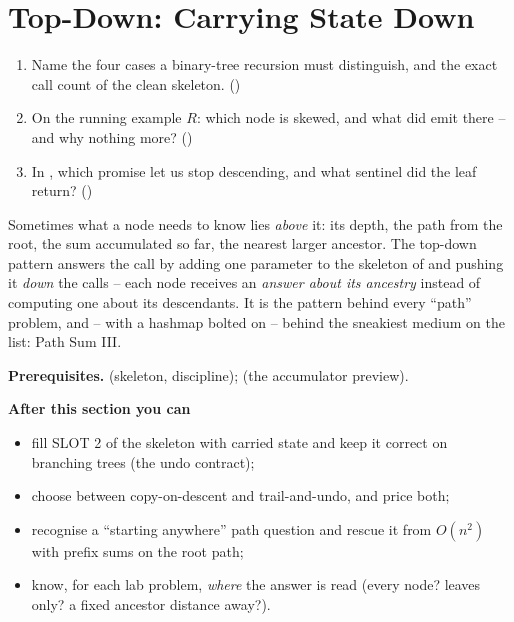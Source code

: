 \section{Top-Down: Carrying State Down}\label{sec:c02-topdown}

\begin{previouslybox}
\begin{enumerate}[nosep, leftmargin=1.6em]
  \item Name the four cases a binary-tree recursion must distinguish, and the
        exact call count of the clean skeleton. ()
  \item On the running example $R$: which node is skewed, and what did
         emit there -- and why nothing more?
        ()
  \item In , which promise let us stop descending, and
        what sentinel did the leaf return? ()
\end{enumerate}
\end{previouslybox}

\begin{topicintro}
Sometimes what a node needs to know lies \emph{above} it: its depth, the path
from the root, the sum accumulated so far, the nearest larger ancestor. The
top-down pattern answers the call by adding one parameter to the skeleton of
 and pushing it \emph{down} the calls -- each node receives an
\emph{answer about its ancestry} instead of computing one about its descendants.
It is the pattern behind every ``path'' problem, and -- with a hashmap bolted on
-- behind the sneakiest medium on the list: Path Sum III.

\textbf{Prerequisites.}  (skeleton,  discipline);
 (the accumulator preview).

\textbf{After this section you can}
\begin{itemize}[nosep]
  \item fill SLOT 2 of the skeleton with carried state and keep it correct on
        branching trees (the undo contract);
  \item choose between copy-on-descent and trail-and-undo, and price both;
  \item recognise a ``starting anywhere'' path question and rescue it from
        $O(n^2)$ with prefix sums on the root path;
  \item know, for each lab problem, \emph{where} the answer is read (every node?
        leaves only? a fixed ancestor distance away?).
\end{itemize}
\end{topicintro}

